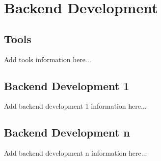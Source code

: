 \newpage
\section{Backend Development}
\subsection{Tools}
Add tools information here...

\subsection{Backend Development 1}
Add backend development 1 information here...

\subsection{Backend Development n}
Add backend development n information here...